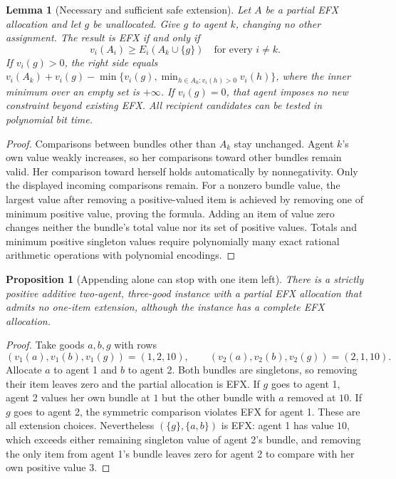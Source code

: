 \documentclass[11pt]{article}
\newtheorem{lemma}[theorem]{Lemma}
\newtheorem{proposition}[theorem]{Proposition}
\theoremstyle{definition}
\begin{document}
\begin{lemma}[Necessary and sufficient safe extension]
Let $A$ be a partial EFX allocation and let $g$ be unallocated. Give $g$ to
agent $k$, changing no other assignment. The result is EFX if and only if
\[
 v_i(A_i)\geq E_i(A_k\cup\{g\})\quad\text{for every }i\ne k.
\]
If $v_i(g)>0$, the right side equals
$v_i(A_k)+v_i(g)-\min\{v_i(g),\min_{h\in A_k:v_i(h)>0}v_i(h)\}$,
where the inner minimum over an empty set is $+\infty$.
If $v_i(g)=0$, that agent imposes no new constraint beyond existing EFX.
All recipient candidates can be tested in polynomial bit time.
\end{lemma}
\begin{proof}
Comparisons between bundles other than $A_k$ stay unchanged. Agent $k$'s
own value weakly increases, so her comparisons toward other bundles remain
valid. Her comparison toward herself holds automatically by nonnegativity.
Only the displayed incoming comparisons remain. For a nonzero bundle value,
the largest value after removing a positive-valued item is achieved by removing
one of minimum positive value, proving the formula. Adding an item of value
zero changes neither the bundle's total value nor its set of positive values.
Totals and minimum positive singleton values require polynomially many exact
rational arithmetic operations with polynomial encodings.
\end{proof}

\begin{proposition}[Appending alone can stop with one item left]
There is a strictly positive additive two-agent, three-good instance with a
partial EFX allocation that admits no one-item extension, although the instance
has a complete EFX allocation.
\end{proposition}
\begin{proof}
Take goods $a,b,g$ with rows
\[
 (v_1(a),v_1(b),v_1(g))=(1,2,10),\qquad
 (v_2(a),v_2(b),v_2(g))=(2,1,10).
\]
Allocate $a$ to agent 1 and $b$ to agent 2. Both bundles are singletons,
so removing their item leaves zero and the partial allocation is EFX.
If $g$ goes to agent 1, agent 2 values her own bundle at $1$ but the other
bundle with $a$ removed at $10$. If $g$ goes to agent 2, the symmetric
comparison violates EFX for agent 1. These are all extension choices.
Nevertheless $(\{g\},\{a,b\})$ is EFX: agent 1 has value $10$, which
exceeds either remaining singleton value of agent 2's bundle, and removing
the only item from agent 1's bundle leaves zero for agent 2 to compare with
her own positive value $3$.
\end{proof}
\end{document}
